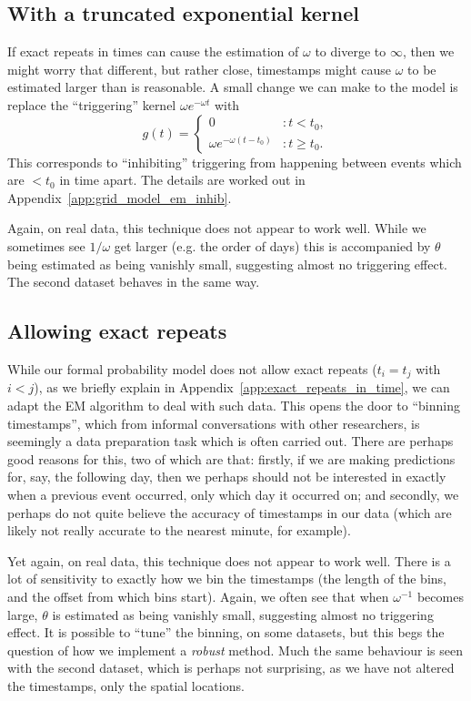 \documentclass[twoside,a4paper]{article}
\theoremstyle{plain}
\theoremstyle{definition}
\begin{document}
\subsection{With a truncated exponential kernel}

If exact repeats in times can cause the estimation of $\omega$ to diverge to $\infty$,
then we might worry that different, but rather close, timestamps might cause $\omega$ to
be estimated larger than is reasonable.  A small change we can make to the model is
replace the ``triggering'' kernel $\omega e^{-\omega t}$ with 
\[ g(t) = \begin{cases} 0 &: t<t_0, \\ \omega e^{-\omega(t-t_0)} &: t\geq t_0.
\end{cases} \]
This corresponds to ``inhibiting'' triggering from happening between events which are
$<t_0$ in time apart.  The details are worked out in Appendix~\ref{app:grid_model_em_inhib}.

Again, on real data, this technique does not appear to work well.  While we sometimes
see $1/\omega$ get larger (e.g. the order of days) this is accompanied by $\theta$ being
estimated as being vanishly small, suggesting almost no triggering effect.
The second dataset behaves in the same way.



\subsection{Allowing exact repeats}\label{sec:exact_repeats}

While our formal probability model does not allow exact repeats ($t_i=t_j$ with $i<j$),
as we briefly explain in Appendix~\ref{app:exact_repeats_in_time}, we can adapt the EM
algorithm to deal with such data.  This opens the door to ``binning timestamps'', which
from informal conversations with other researchers, is seemingly a data preparation task
which is often carried out.  There are perhaps good reasons for this, two of which are
that: firstly, if we are making predictions for, say, the following day, then we perhaps
should not be interested in exactly when a previous event occurred, only which day it
occurred on; and secondly, we perhaps do not quite believe the accuracy of timestamps in
our data (which are likely not really accurate to the nearest minute, for example).

Yet again, on real data, this technique does not appear to work well.  There is a lot of
sensitivity to exactly how we bin the timestamps (the length of the bins, and the offset
from which bins start).  Again, we often see that when $\omega^{-1}$ becomes large,
$\theta$ is estimated as being vanishly small, suggesting almost no triggering effect.
It is possible to ``tune'' the binning, on some datasets, but this begs the question of
how we implement a \emph{robust} method.  Much the same behaviour is seen with the second
dataset, which is perhaps not surprising, as we have not altered the timestamps, only the
spatial locations.
\end{document}
